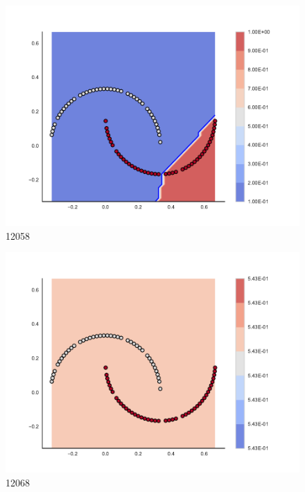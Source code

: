 \begin{subfigure}[b]{0.09\textwidth}
    \includegraphics[width=\textwidth]{img/convergence/12058.pdf}
    \caption{12058}
    \label{fig:convergence_12058}
\end{subfigure}
%
\begin{subfigure}[b]{0.09\textwidth}
    \includegraphics[width=\textwidth]{img/convergence/12068.pdf}
    \caption{12068}
    \label{fig:convergence_12068}
\end{subfigure}
%
